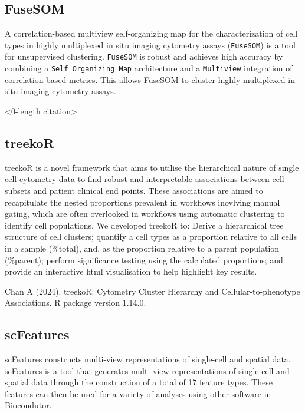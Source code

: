 \documentclass[
  letterpaper,
  DIV=11,
  numbers=noendperiod]{scrreprt}
\begin{document}
\subsection*{FuseSOM}\label{fusesom}

A correlation-based multiview self-organizing map for the
characterization of cell types in highly multiplexed in situ imaging
cytometry assays (\texttt{FuseSOM}) is a tool for unsupervised
clustering. \texttt{FuseSOM} is robust and achieves high accuracy by
combining a \texttt{Self\ Organizing\ Map} architecture and a
\texttt{Multiview} integration of correlation based metrics. This allows
FuseSOM to cluster highly multiplexed in situ imaging cytometry assays.

\textless0-length citation\textgreater{}

\subsection*{treekoR}\label{treekor}

treekoR is a novel framework that aims to utilise the hierarchical
nature of single cell cytometry data to find robust and interpretable
associations between cell subsets and patient clinical end points. These
associations are aimed to recapitulate the nested proportions prevalent
in workflows inovlving manual gating, which are often overlooked in
workflows using automatic clustering to identify cell populations. We
developed treekoR to: Derive a hierarchical tree structure of cell
clusters; quantify a cell types as a proportion relative to all cells in
a sample (\%total), and, as the proportion relative to a parent
population (\%parent); perform significance testing using the calculated
proportions; and provide an interactive html visualisation to help
highlight key results.

Chan A (2024). treekoR: Cytometry Cluster Hierarchy and
Cellular-to-phenotype Associations. R package version 1.14.0.

\subsection*{scFeatures}\label{scfeatures}

scFeatures constructs multi-view representations of single-cell and
spatial data. scFeatures is a tool that generates multi-view
representations of single-cell and spatial data through the construction
of a total of 17 feature types. These features can then be used for a
variety of analyses using other software in Biocondutor.
\end{document}
